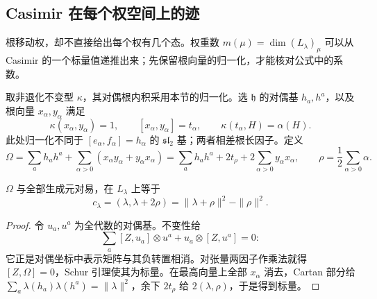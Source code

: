 \subsection{Casimir 在每个权空间上的迹}

根移动权，却不直接给出每个权有几个态。权重数 $m(\mu)=\dim (L_\lambda)_\mu$ 可以从 Casimir 的一个标量值递推出来；先保留根向量的归一化，才能核对公式中的系数。

\begin{definition}
取非退化不变型 $\kappa$，其对偶根内积采用本节的归一化。选 $\mathfrak h$ 的对偶基 $h_a,h^a$，以及根向量 $x_\alpha,y_\alpha$ 满足
\[
 \kappa(x_\alpha,y_\alpha)=1,\qquad
 [x_\alpha,y_\alpha]=t_\alpha,\qquad
 \kappa(t_\alpha,H)=\alpha(H).
\]
此处归一化不同于 $[e_\alpha,f_\alpha]=h_\alpha$ 的 $\mathfrak{sl}_2$ 基；两者相差根长因子。定义
\[
 \Omega=\sum_a h_ah^a+\sum_{\alpha>0}(x_\alpha y_\alpha+y_\alpha x_\alpha)
 =\sum_a h_ah^a+2t_\rho+2\sum_{\alpha>0}y_\alpha x_\alpha,
 \qquad \rho=\frac12\sum_{\alpha>0}\alpha.
\]
\end{definition}

\begin{proposition}
$\Omega$ 与全部生成元对易，在 $L_\lambda$ 上等于
\[
 c_\lambda=(\lambda,\lambda+2\rho)=\|\lambda+\rho\|^2-\|\rho\|^2.
\]
\end{proposition}
\begin{proof}
令 $u_a,u^a$ 为全代数的对偶基。不变性给
\[
 \sum_a[Z,u_a]\otimes u^a+u_a\otimes[Z,u^a]=0:
\]
它正是对偶坐标中表示矩阵与其负转置相消。对张量两因子作乘法就得 $[Z,\Omega]=0$，Schur 引理使其为标量。在最高向量上全部 $x_\alpha$ 消去，Cartan 部分给 $\sum_a\lambda(h_a)\lambda(h^a)=\|\lambda\|^2$，余下 $2t_\rho$ 给 $2(\lambda,\rho)$，于是得到标量。
\end{proof}

